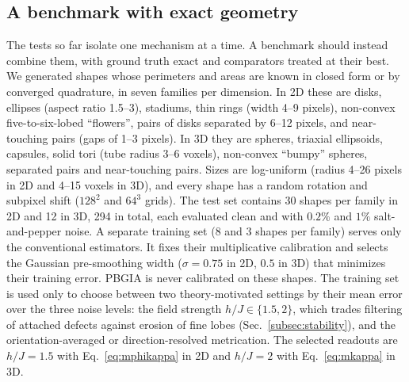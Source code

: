 \documentclass[11pt,a4paper]{article}
\begin{document}
\subsection{A benchmark with exact geometry}\label{subsec:res:bench}
The tests so far isolate one mechanism at a time. A benchmark should instead combine them, with ground truth exact and comparators treated at their best. We generated shapes whose perimeters and areas are known in closed form or by converged quadrature, in seven families per dimension. In 2D these are disks, ellipses (aspect ratio 1.5--3), stadiums, thin rings (width 4--9 pixels), non-convex five-to-six-lobed ``flowers'', pairs of disks separated by 6--12 pixels, and near-touching pairs (gaps of 1--3 pixels). In 3D they are spheres, triaxial ellipsoids, capsules, solid tori (tube radius 3--6 voxels), non-convex ``bumpy'' spheres, separated pairs and near-touching pairs. Sizes are log-uniform (radius 4--26 pixels in 2D and 4--15 voxels in 3D), and every shape has a random rotation and subpixel shift ($128^2$ and $64^3$ grids). The test set contains 30 shapes per family in 2D and 12 in 3D, 294 in total, each evaluated clean and with $0.2\%$ and $1\%$ salt-and-pepper noise. A separate training set (8 and 3 shapes per family) serves only the conventional estimators. It fixes their multiplicative calibration and selects the Gaussian pre-smoothing width ($\sigma=0.75$ in 2D, $0.5$ in 3D) that minimizes their training error. PBGIA is never calibrated on these shapes. The training set is used only to choose between two theory-motivated settings by their mean error over the three noise levels: the field strength $h/J\in\{1.5,2\}$, which trades filtering of attached defects against erosion of fine lobes (Sec.~\ref{subsec:stability}), and the orientation-averaged or direction-resolved metrication. The selected readouts are $h/J=1.5$ with Eq.~\eqref{eq:mphikappa} in 2D and $h/J=2$ with Eq.~\eqref{eq:mkappa} in 3D.
\end{document}

